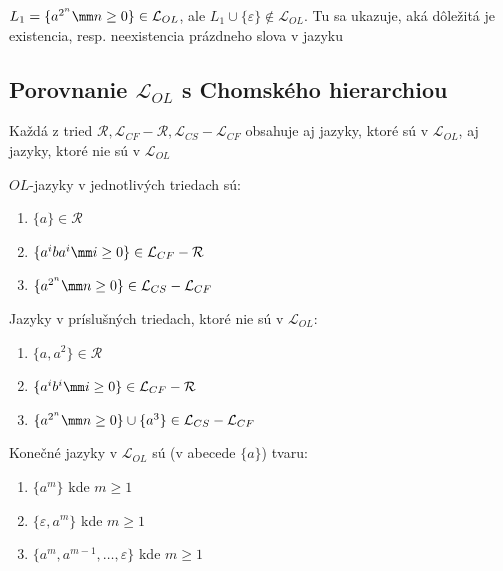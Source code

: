 \begin{poznamka}
$L_{1}=\{a^{2^{n}}\mm n\geq0\}\in\mathcal{L}_{OL}$, ale
$L_{1}\cup\{\varepsilon\}\not\in\mathcal{L}_{OL}$. Tu sa ukazuje,
aká dôležitá je existencia, resp. neexistencia prázdneho slova v
jazyku
\end{poznamka}

\subsection{Porovnanie $\mathcal{L}_{OL}$ s Chomského hierarchiou}

\begin{veta}
Každá z tried $\mathcal{R},\mathcal{L}_{CF} - \mathcal{R},
\mathcal{L}_{CS} - \mathcal{L}_{CF}$ obsahuje aj jazyky, ktoré sú
v $\mathcal{L}_{OL}$, aj jazyky, ktoré nie sú v $\mathcal{L}_{OL}$
\end{veta}

\begin{dokaz}
$OL$-jazyky v jednotlivých triedach sú:

\begin{enumerate}
\item $\{a\}\in\mathcal{R}$
\item $\{a^{i}ba^{i}\mm i\geq0\}\in\mathcal{L}_{CF} - \mathcal{R}$
\item $\{a^{2^{n}}\mm n\geq0\}\in\mathcal{L}_{CS} - \mathcal{L}_{CF}$
\end{enumerate}

Jazyky v príslušných triedach, ktoré nie sú v $\mathcal{L}_{OL}$:

\begin{enumerate}
\item $\{a,a^{2}\}\in\mathcal{R}$
\item $\{a^{i}b^{i}\mm i\geq0\}\in\mathcal{L}_{CF} - \mathcal{R}$
\item $\{a^{2^{n}}\mm n\geq0\}\cup\{a^{3}\}\in\mathcal{L}_{CS}
- \mathcal{L}_{CF}$
\end{enumerate}
\end{dokaz}

\begin{poznamka}
Konečné jazyky v $\mathcal{L}_{OL}$ sú (v abecede $\{a\}$) tvaru:
\begin{enumerate}
\item $\{a^{m}\}$ kde $m\geq1$
\item $\{\varepsilon,a^{m}\}$ kde $m\geq1$
\item $\{a^{m},a^{m-1},\dots,\varepsilon\}$ kde $m\geq1$
\end{enumerate}
\end{poznamka}

